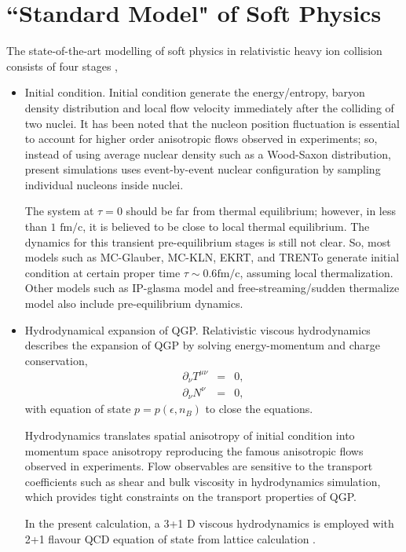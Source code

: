 \documentclass[aps,prl,twocolumn,groupedaddress]{revtex4-1}
\begin{document}
\section{``Standard Model" of Soft Physics}
	The state-of-the-art modelling of soft physics in relativistic heavy ion collision consists of four stages \citep{Bass:2000:hybrid-model, Shen:2014VishNew}, 
	\begin{itemize}
		\item Initial condition. 		
		Initial condition generate the energy/entropy, baryon density distribution and local flow velocity immediately after the colliding of two nuclei.
		It has been noted that the nucleon position fluctuation is essential to account for higher order anisotropic flows observed in experiments;
		so, instead of using average nuclear density such as a Wood-Saxon distribution, present simulations uses event-by-event nuclear configuration by sampling individual nucleons inside nuclei.
		
		The system at $\tau = 0$ should be far from thermal equilibrium; however, in less than $1 \textrm{ fm/c}$, it is believed to be close to local thermal equilibrium.
		The dynamics for this transient pre-equilibrium stages is still not clear.
		So, most models such as MC-Glauber, MC-KLN, EKRT, and TRENTo generate initial condition at certain proper time $\tau\sim 0.6\textrm{fm/c}$, assuming local thermalization.
		Other models such as IP-glasma model and free-streaming/sudden thermalize model also include pre-equilibrium dynamics.
		
		\item Hydrodynamical expansion of QGP. 
		Relativistic viscous hydrodynamics describes the expansion of QGP by solving energy-momentum and charge conservation,
		\begin{eqnarray}
			\partial_\nu T^{\mu\nu} &=& 0, \\
			\partial_\nu N^{\nu} &=& 0,
		\end{eqnarray}
		with equation of state $p = p(\epsilon, n_B)$ to close the equations. 
		
		Hydrodynamics translates spatial anisotropy of initial condition into momentum space anisotropy reproducing the famous anisotropic flows observed in experiments. 
		Flow observables are sensitive to the transport coefficients such as shear and bulk viscosity in hydrodynamics simulation, which provides tight constraints on the transport properties of QGP.
		
		In the present calculation, a 3+1 D viscous hydrodynamics is employed \citep{Karpenko:2014vhlle} with 2+1 flavour QCD equation of state from lattice calculation \cite{Bazavov:2014hotqcd-eos}.
		


\end{itemize}
\end{document}
